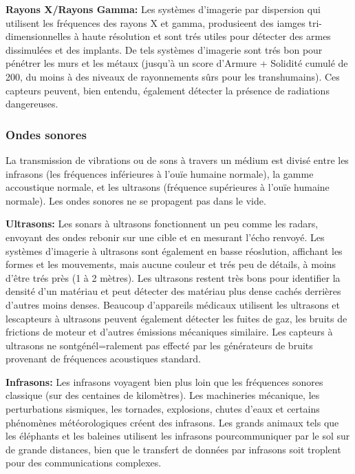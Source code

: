 {{\textbf{Rayons X/Rayons Gamma:} Les systèmes d'imagerie par dispersion qui utilisent les fréquences des rayons X et gamma, produsieent des iamges tri-dimensionnelles à haute résolution et sont trés utiles pour détecter des armes dissimulées et des implants. De tels systèmes d'imagerie sont trés bon pour pénétrer les murs et les métaux (jusqu'à un score d'Armure + Solidité cumulé de 200, du moins à des niveaux de rayonnements sûrs pour les transhumains). Ces capteurs peuvent, bien entendu, également détecter la présence de radiations dangereuses. 

\subsubsection{Ondes sonores} 

La transmission de vibrations ou de sons à travers un médium est divisé entre les infrasons (les fréquences inférieures à l'ouïe humaine normale), la gamme accoustique normale, et les ultrasons (fréquence supérieures à l'ouïe humaine normale). Les ondes sonores ne se propagent pas dans le vide. 

\textbf{Ultrasons:} Les sonars à ultrasons fonctionnent un peu comme les radars, envoyant des ondes rebonir sur une cible et en mesurant l'écho renvoyé. Les systèmes d'imagerie à ultrasons sont également en basse réoslution, affichant les formes et les mouvements, mais aucune couleur et trés peu de détails, à moins d'être trés près (1 à 2 mètres). Les ultrasons restent très bons pour identifier la densité d'un matériau et peut détecter des matériau plus dense cachés derrières d'autres moins denses. Beaucoup d'appareils médicaux utilisent les ultrasons et lescapteurs à ultrasons peuvent également détecter les fuites de gaz, les bruits de frictions de moteur et d'autres émissions mécaniques similaire. Les capteurs à ultrasons ne sontgénél=ralement pas effecté par les générateurs de bruits provenant de fréquences acoustiques standard. 

\textbf{Infrasons:} Les infrasons voyagent bien plus loin que les fréquences sonores classique (sur des centaines de kilomètres). Les machineries mécanique, les perturbations sismiques, les tornades, explosions, chutes d'eaux et certains phénomènes météorologiques créent des infrasons. Les grands animaux tels que les éléphants et les baleines utilisent les infrasons pourcommuniquer par le sol sur de grande distances, bien que le transfert de données par infrasons soit troplent pour des communications complexes. 

}}
